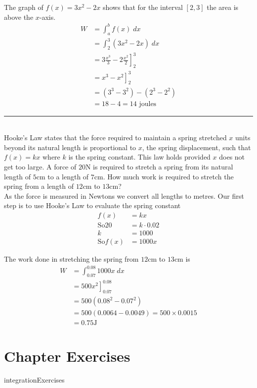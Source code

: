 \solution The graph of $f (x) =3 x^{2} -2 x$ shows that for the interval $\left [2 ,3\right ]$ the area is above the $x$-axis.
\begin{align*}W &  = \int _{a}^{b}f (x)\; d x \\
 &  = \int _{2}^{3}\left (3 x^{2} -2 x\right )\; d x \\
 &  = \left .3 \frac{x^{3}}{3} -2 \frac{x^{2}}{2}\right ]_{2}^{3} \\
 &  = \left .x^{3} -x^{2}\right ]_{2}^{3} \\
 &  = \left (3^{3} -3^{2}\right ) -\left (2^{3} -2^{2}\right ) \\
 &  = 18 -4 =14\text{ joules}\end{align*}
\rule{6.8cm}{0.5pt}\\
\example Hooke's Law states that the force required to maintain a spring stretched $x$ units beyond its natural length is proportional to $x$, the spring displacement, such that $f (x) =k x$ where $k$ is the spring constant. This law holds provided $x$ does not get too large. A force of $20 \mbox{N}$ is required to stretch a spring from its natural length of $5 \mbox{cm}$ to a length of $7 \mbox{cm}$. How much work is required to stretch the spring from a length of $12 \mbox{cm}$ to $13 \mbox{cm}$? \\

\solution As the force is measured in Newtons we convert all lengths to metres. Our first step is to use Hooke's Law to evaluate the spring constant
\begin{align*}f (x) &  = k x \\
\text{So}20 &  = k \cdot 0.02 \\
k &  = 1000 \\
\text{So}f (x) &  = 1000 x\end{align*}

The work done in stretching the spring from $12 \mbox{cm}$ to $13 \mbox{cm}$ is
\begin{align*}W &  = \int _{0.07}^{0.08}1000 x\; d x \\
 &  = \left .500 x^{2}\right ]_{0.07}^{0.08} \\
 &  = 500 \left (0.08^{2} -0.07^{2}\right ) \\
 &  = 500 \left (0.0064 -0.0049\right ) =500 \times 0.0015 \\
 &  = 0.75\text{}\mbox{J}\end{align*}

\section{Chapter Exercises}
{integrationExercises}


 



